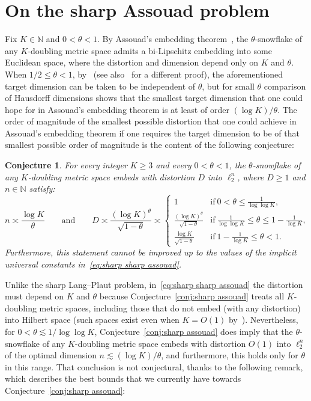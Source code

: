 \documentclass[11pt,reqno]{amsart}
\newtheorem{conjecture}[theorem]{Conjecture}
\newcommand{\N}{\mathbb{N}}
\renewcommand{\le}{\leqslant}
\renewcommand{\ge}{\geqslant}
\newcommand{\1}{\mathbf{1}}
\begin{document}
\section{On the sharp Assouad problem}\label{sec:sharp assouad}


Fix $K\in \N$ and  $0<\theta<1$. By Assouad's  embedding theorem~\cite{Assouad}, the $\theta$-snowflake of any $K$-doubling metric space admits a bi-Lipschitz embedding into some Euclidean space, where the distortion and dimension depend only on $K$ and $\theta$. When $1/2\le \theta<1$, by~\cite{NN} (see also~\cite{DS13} for a different proof), the aforementioned target dimension can be taken to be independent of $\theta$, but for small $\theta$ comparison of Hausdorff dimensions shows that the smallest target dimension that one could hope for in Assouad's embedding theorem is at least of order  $(\log K)/\theta$. The order of magnitude of the smallest possible distortion that one could achieve in Assouad's embedding theorem if one requires the target dimension to be of that smallest possible order of magnitude is the content of the following conjecture: 

\begin{conjecture}\label{conj:sharp assouad} For every integer $K\ge 3$ and every $0<\theta<1$, the $\theta$-snowflake of any $K$-doubling metric space embeds with distortion $D$ into $\ell_2^n$, where $D\ge 1$ and $n\in \N$ satisfy:  
\begin{equation}\label{eq:sharp sharp assouad}
n\asymp \frac{\log K}{\theta}\qquad\mathrm{and}\qquad D\asymp \frac{(\log K)^\theta}{\sqrt{1-\theta}}\asymp \left\{\begin{array}{ll}1&\mathrm{if\ } 0<\theta\le \frac{1}{\log \log K},\\
\frac{(\log K)^\theta}{\sqrt{1-\theta}} &\mathrm{if\ } \frac{1}{\log \log K}\le \theta \le 1-\frac{1}{\log K},\\
\frac{\log K}{\sqrt{1-\theta}}&\mathrm{if\ } 1-\frac{1}{\log K}\le \theta<1.\end{array}\right.
\end{equation}
Furthermore, this statement cannot be improved up to the values of the implicit universal constants in~\eqref{eq:sharp sharp assouad}. 
\end{conjecture}



Unlike  the sharp Lang--Plaut problem, in~\eqref{eq:sharp sharp assouad} the distortion must depend on $K$ and $\theta$ because Conjecture~\eqref{conj:sharp assouad} treats all $K$-doubling metric spaces,  including those that do not embed (with any distortion) into Hilbert space (such spaces exist even when $K=O(1)$ by~\cite{Pan89,Sem99}). Nevertheless,  for $0<\theta\lesssim 1/\log\log K$,  Conjecture~\eqref{conj:sharp assouad} does imply that the $\theta$-snowflake   of any $K$-doubling metric space embeds with distortion $O(1)$ into $\ell_2^n$ of the optimal dimension  $n\lesssim (\log K)/\theta$, and furthermore, this holds only for  $\theta$ in this range.  That conclusion is not conjectural, thanks to the following remark, which describes the best bounds that we currently have towards Conjecture~\eqref{conj:sharp assouad}:
\end{document}
